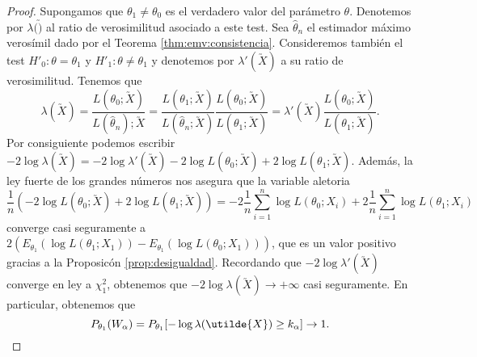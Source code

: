         \begin{proof}
            Supongamos que $\theta_1 \ne \theta_0$ es el verdadero valor del parámetro $\theta$. Denotemos por $\lambda(\utilde)$ al ratio de verosimilitud asociado a este test. Sea $\hat{\theta}_n$ el estimador máximo verosímil dado por el Teorema \ref{thm:emv:consistencia}.  Consideremos también el test $H'_0: \theta = \theta_1$ y $H'_1: \theta \ne \theta_1$ y denotemos por $\lambda'(\utilde{X})$ a su ratio de verosimilitud. Tenemos que
            \[\lambda(\utilde{X}) = \frac{L(\theta_0; \utilde{X})}{L(\hat{\theta}_n); \utilde{X}} = \frac{L(\theta_1; \utilde{X})}{L(\hat{\theta}_n; \utilde{X})} \frac{L(\theta_0; \utilde{X})}{L(\theta_1; \utilde{X})} = \lambda'(\utilde{X}) \frac{L(\theta_0; \utilde{X})}{L(\theta_1; \utilde{X})}.\]
            Por consiguiente podemos escribir $- 2 \log \lambda(\utilde{X}) = - 2 \log \lambda'(\utilde{X}) - 2 \log L(\theta_0; \utilde{X}) + 2 \log L(\theta_1; \utilde{X})$.  Además,  la ley fuerte de los grandes números nos asegura que la variable aletoria
            \[\frac{1}{n} \left(- 2\log L(\theta_0; \utilde{X}) + 2 \log L(\theta_1; \utilde{X})\right) = - 2 \frac{1}{n} \sum_{i = 1}^n \log L(\theta_0; X_i) + 2 \frac{1}{n} \sum_{i = 1}^n \log L(\theta_1; X_i)\]
            converge casi seguramente a $2(E_{\theta_1}(\log L(\theta_1; X_1)) - E_{\theta_1}(\log L(\theta_0; X_1)))$, que es un valor positivo gracias a la Proposicón \ref{prop:desigualdad}. Recordando que $-2 \log \lambda'(\utilde{X})$ converge en ley a $\chi_1^2$, obtenemos que $- 2 \log \lambda(\utilde{X}) \to +\infty$ casi seguramente. En particular, obtenemos que
            \[P_{\theta_1}(W_\alpha) = P_{\theta_1}[- \log \lambda(\utilde{X}) \ge k_\alpha] \to 1. \qedhere\]
        \end{proof}
